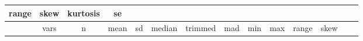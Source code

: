 \begin{longtable}[]{@{}cccccccccccccc@{}}
\begin{minipage}[b]{0.04\columnwidth}
range\strut
\end{minipage} & \begin{minipage}[b]{0.05\columnwidth}\centering\strut
skew\strut
\end{minipage} & \begin{minipage}[b]{0.06\columnwidth}\centering\strut
kurtosis\strut
\end{minipage} & \begin{minipage}[b]{0.06\columnwidth}\centering\strut
se\strut
\end{minipage}\tabularnewline
\midrule
\endfirsthead
\toprule
\begin{minipage}[b]{0.07\columnwidth}\centering\strut
~\strut
\end{minipage} & \begin{minipage}[b]{0.04\columnwidth}\centering\strut
vars\strut
\end{minipage} & \begin{minipage}[b]{0.04\columnwidth}\centering\strut
n\strut
\end{minipage} & \begin{minipage}[b]{0.05\columnwidth}\centering\strut
mean\strut
\end{minipage} & \begin{minipage}[b]{0.05\columnwidth}\centering\strut
sd\strut
\end{minipage} & \begin{minipage}[b]{0.05\columnwidth}\centering\strut
median\strut
\end{minipage} & \begin{minipage}[b]{0.05\columnwidth}\centering\strut
trimmed\strut
\end{minipage} & \begin{minipage}[b]{0.05\columnwidth}\centering\strut
mad\strut
\end{minipage} & \begin{minipage}[b]{0.03\columnwidth}\centering\strut
min\strut
\end{minipage} & \begin{minipage}[b]{0.03\columnwidth}\centering\strut
max\strut
\end{minipage} & \begin{minipage}[b]{0.04\columnwidth}\centering\strut
range\strut
\end{minipage} & \begin{minipage}[b]{0.05\columnwidth}\centering\strut
skew\strut
\end{minipage} & \begin{minipage}[b]{0.06\columnwidth}\centering\strut

\end{minipage}
\end{longtable}
